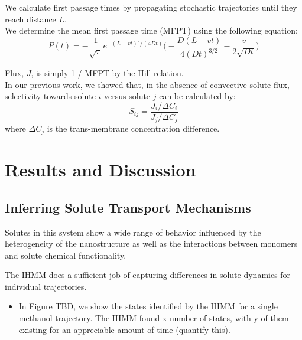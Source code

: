 \documentclass{article}
\begin{document}
  \noindent We calculate first passage times by propagating stochastic trajectories until they
  reach distance $L$. \\
  
  We determine the mean first passage time (MFPT) using the following equation:~\cite{cussler_diffusion:_2009}
  \begin{equation}
  P(t) = -\frac{1}{\sqrt{\pi}}e^{-(L - vt)^2 / (4Dt)}\bigg(-\frac{D(L - vt)}{4(Dt)^{3/2}} - \frac{v}{2\sqrt{Dt}}\bigg)
  \label{eqn:passage_times}
  \end{equation}
  
  \noindent Flux, $J$, is simply 1 / MFPT by the Hill relation.~\cite{hill_free_1989} \\
  
  In our previous work, we showed that, in the absence of convective solute flux, selectivity
  towards solute $i$ versus solute $j$ can be calculated by:  
  \begin{equation}
  S_{ij} = \frac{J_i / \Delta C_i}{J_j / \Delta C_j}
  \label{eqn:selectivity}
  \end{equation}
  where $\Delta C_j$ is the trans-membrane concentration difference.

  \section{Results and Discussion}

  \subsection{Inferring Solute Transport Mechanisms}
  
  
  Solutes in this system show a wide range of behavior influenced by the 
  heterogeneity of the nanostructure as well as the interactions between 
  monomers and solute chemical functionality.
  
  The IHMM does a sufficient job of capturing differences in solute dynamics
  for individual trajectories.
  \begin{itemize}
    \item In Figure TBD, we show the states identified by the IHMM for a single
    methanol trajectory. The IHMM found x number of states, with y of them 
    existing for an appreciable amount of time (quantify this).
  \end{itemize}
  
\end{document}
